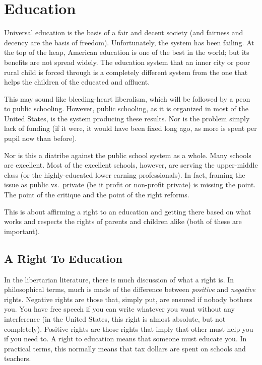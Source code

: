 \chapter{Education}%
\label{chpt:education}

Universal education is the basis of a fair and decent society (and fairness and
decency are the basis of freedom). Unfortunately, the system has been failing.
At the top of the heap, American education is one of the best in the world; but
its benefits are not spread widely. The education system that an inner city or
poor rural child is forced through is a completely different system from the
one that helps the children of the educated and affluent.

This may sound like bleeding-heart liberalism, which will be followed by a peon
to public schooling. However, public schooling, as it is organized in most of
the United States, is the system producing these results. Nor is the problem
simply lack of funding (if it were, it would have been fixed long ago, as more
is spent per pupil now than before).

Nor is this a diatribe against the public school system as a whole. Many
schools are excellent. Most of the excellent schools, however, are serving the
upper-middle class (or the highly-educated lower earning professionals). In
fact, framing the issue as public vs.\ private (be it profit or non-profit
private) is missing the point. The point of the critique and the point of the
right reforms.

This is about affirming a right to an education and getting there based on what
works and respects the rights of parents and children alike (both of these are
important).

\section{A Right To Education}

In the libertarian literature, there is much discussion of what a right is. In
philosophical terms, much is made of the difference between \emph{positive} and
\emph{negative} rights. Negative rights are those that, simply put, are ensured
if nobody bothers you. You have free speech if you can write whatever you want
without any interference (in the United States, this right is almost
absolute, but not completely). Positive rights are those rights that imply that
other must help you if you need to. A right to education means that someone
must educate you. In practical terms, this normally means that tax dollars are
spent on schools and teachers.

